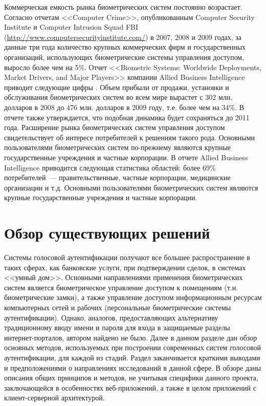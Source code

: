Коммерческая емкость рынка биометрических систем постоянно возрастает. Согласно отчетам <<Computer Crime>>, опубликованным Computer Security Institute и Computer Intrusion Squad FBI (\url{http://www.computersecurityinstitute.com/}) в 2007, 2008 и 2009 годах, за данные три года количество крупных коммерческих фирм и государственных организаций, использующих биометрические системы управления доступом, выросло более чем на 5\%. Отчет <<Biometric Systems: Worldwide Deployments, Market Drivers, and Major Players>> компании Allied Business Intelligence приводит следующие цифры \cite{ABI02Trends}. Объем прибыли от продажи, установки и обслуживания биометрических систем во всем мире вырастет с 302 млн. долларов в 2008 до 476 млн. долларов в 2009 году, т.е. более чем на 34\%. В отчете также утверждается, что подобная динамика будет сохраняться до 2011 года. Расширение рынка биометрических систем управления доступом свидетельствует об интересе потребителей к решениям такого рода. Основными пользователями биометрических систем по-прежнему являются крупные государственные учреждения и частные корпорации. В отчете Allied Business Intelligence приводится следующая статистика областей: более 69\% потребителей~--- правительственные, частные корпорации, медицинские организации и т.д. Основными пользователями биометрических систем являются крупные государственные учреждения и частные корпорации.

\section{Обзор существующих решений}
\label{sec:overview}

Системы голосовой аутентификации получают все большее распространение в таких сферах, как банковские услуги, при подтверждении сделок, в системах <<умный дом>>. Основными направлениями применения биометрических систем является биометрическое управление доступом к помещениям (т.н. биометрические замки), а также управление доступом информационным ресурсам компьютерных сетей и рабочих (персональные биометрические системы аутентификации). Однако, аналогов, предоставляющих альтернативу традиционному вводу имени и пароля для входа в защищаемые разделы интернет-порталов, автором найдено не было. Далее в данном разделе дан обзор основных методов, используемых при построении современных систем голосовой аутентификации, для каждой из стадий. Раздел заканчивается краткими выводами и предположениями о направлениях исследований в данной сфере. В обзоре даны описания общих принципов и методов, не учитывая специфики данного проекта, заключающейся в особенностях веб-приложений, а также в целом приложений с клиент-серверной архитектурой.

